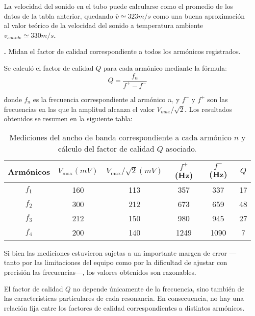 \documentclass[12pt, a4paper]{article}
\newcounter{step}
\newcommand{\step}[1]
{
  \par\vspace{2ex}
  \stepcounter{step}
  \noindent\textbf{\arabic{step}.} #1\par\vspace{1ex}
}
\begin{document}
La velocidad del sonido en el tubo puede calcularse como el promedio de los datos de la tabla anterior, quedando $\overline{v} \simeq 323 m/s$ como una buena aproximación al valor teórico de la velocidad del sonido a temperatura ambiente $v_{sonido}\simeq 330 m/s$.


\step{Midan el factor de calidad correspondiente a todos los armónicos registrados.}

Se calculó el factor de calidad $Q$ para cada armónico mediante la fórmula:
$$Q = \frac{f_n}{f^+ - f^-}$$

donde $f_{n}$ es la frecuencia correspondiente al armónico $n$, y $f^-$ y $f^+$ son las frecuencias en las que la amplitud alcanza el valor $V_{max}/\sqrt{2}$. Los resultados obtenidos se resumen en la siguiente tabla:

\begin{table}[H]
    \centering
    \begin{tabular}{|c|c|c|c|c|c|}
    \hline
    \multirow{1}{2.1cm}{\centering Armónicos} 
        & $V_\mathrm{max} (mV)$
        & $V_\mathrm{max}/\sqrt{2} (mV)$ 
        & $f^+$ (Hz) 
        & $f^-$ (Hz)
        & $Q$ \\
    \hline
    $f_1$  & 160 & 113 & 357 & 337 & 17\\ \hline
    $f_2$  & 300 & 212 & 673 & 659 & 48\\ \hline
    $f_3$  & 212  & 150 & 980 & 945 & 27\\ \hline
    $f_4$  & 200  & 140 & 1249 & 1090 & 7\\ \hline
    \end{tabular}
    \caption{\centering Mediciones del ancho de banda correspondiente a cada armónico $n$ y cálculo del factor de calidad $Q$ asociado.}
    \label{tabla3}
\end{table}

Si bien las mediciones estuvieron sujetas a un importante margen de error —tanto por las limitaciones del equipo como por la dificultad de ajustar con precisión las frecuencias—, los valores obtenidos son razonables. 

El factor de calidad $Q$ no depende únicamente de la frecuencia, sino también de las características particulares de cada resonancia. En consecuencia, no hay una relación fija entre los factores de calidad correspondientes a distintos armónicos.
\end{document}
